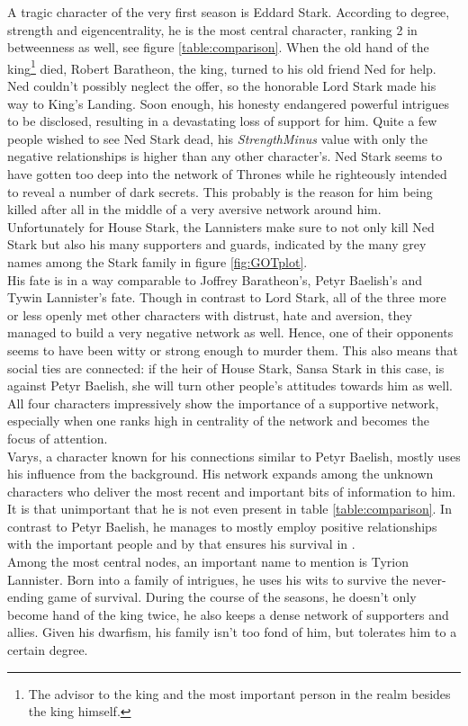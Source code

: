 A tragic character of the very first season is Eddard Stark. According to degree, strength and eigencentrality, he is the most central character, ranking 2 in betweenness as well, see figure \ref{table:comparison}. When the old hand of the king\footnote{The advisor to the king and the most important person in the realm besides the king himself.} died, Robert Baratheon, the king, turned to his old friend Ned for help. Ned couldn't possibly neglect the offer, so the honorable Lord Stark made his way to King's Landing. Soon enough, his honesty endangered powerful intrigues to be disclosed, resulting in a devastating loss of support for him. Quite a few people wished to see Ned Stark dead, his \textit{StrengthMinus} value with only the negative relationships is higher than any other character's. Ned Stark seems to have gotten too deep into the network of Thrones while he righteously intended to reveal a number of dark secrets. This probably is the reason for him being killed after all in the middle of a very aversive network around him. Unfortunately for House Stark, the Lannisters make sure to not only kill Ned Stark but also his many supporters and guards, indicated by the many grey names among the Stark family in figure \ref{fig:GOTplot}.\\
His fate is in a way comparable to Joffrey Baratheon's, Petyr Baelish's and Tywin Lannister's fate. Though in contrast to Lord Stark, all of the three more or less openly met other characters with distrust, hate and aversion, they managed to build a very negative network as well. Hence, one of their opponents seems to have been witty or strong enough to murder them. This also means that social ties are connected: if the heir of House Stark, Sansa Stark in this case, is against Petyr Baelish, she will turn other people’s attitudes  towards him as well. All four characters impressively show the importance of a supportive network, especially when one ranks high in centrality of the network and becomes the focus of attention.\\
Varys, a character known for his connections similar to Petyr Baelish, mostly uses his influence from the background. His network expands among the unknown characters who deliver the most recent and important bits of information to him. It is that unimportant that he is not even present in table \ref{table:comparison}. In contrast to Petyr Baelish, he manages to mostly employ positive relationships with the important people and by that ensures his survival in \got.\\
Among the most central nodes, an important name to mention is Tyrion Lannister. Born into a family of intrigues, he uses his wits to survive the never-ending game of survival. During the course of the seasons, he doesn't only become hand of the king twice, he also keeps a dense network of supporters and allies. Given his dwarfism, his family isn't too fond of him, but tolerates him to a certain degree.\\
